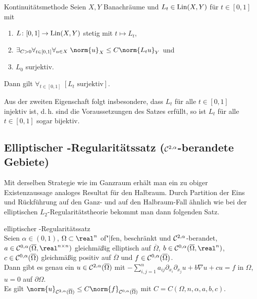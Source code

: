 \begin{Satz}{Kontinuitätsmethode}
    Seien $X, Y$ Banachräume und $L_t \in \operatorname{Lin}(X, Y)$ für $t \in [0, 1]$ mit
    \begin{enumerate}
        \item
        $L\colon [0,1] \rightarrow \operatorname{Lin}(X, Y)$ stetig mit $t \mapsto L_t$,

        \item
        $\exists_{C > 0} \forall_{t \in [0, 1]} \forall_{u \in X}\;
        \norm{u}_X \le C \norm{L_t u}_Y$ und

        \item
        $L_0$ surjektiv.
    \end{enumerate}
    Dann gilt $\forall_{t \in [0, 1]}\; [\text{$L_t$ surjektiv}]$.
\end{Satz}

\begin{Bem}
    Aus der zweiten Eigenschaft folgt insbesondere, dass $L_t$ für alle $t \in [0, 1]$ injektiv
    ist, d.\,h. sind die Voraussetzungen des Satzes erfüllt, so ist
    $L_t$ für alle $t \in [0, 1]$ sogar bijektiv.
\end{Bem}

\subsection{%
    Elliptischer -Regularitätssatz
    (\texorpdfstring{$\mathcal{C}^{2,\alpha}$}{C² ᵅ}-berandete Gebiete)%
}

\begin{Bem}
    Mit derselben Strategie wie im Ganzraum erhält man ein zu obiger Existenzaussage
    analoges Resultat für den Halbraum.
    Durch Partition der Eins und Rückführung auf den Ganz- und auf den Halbraum-Fall ähnlich wie
    bei der elliptischen $L_2$-Regularitätstheorie bekommt man dann folgenden Satz.
\end{Bem}

\begin{Satz}{elliptischer -Regularitätssatz}\\
    Seien $\alpha \in (0, 1)$,
    $\Omega \subset \real^n$ of"|fen, beschränkt und $\mathcal{C}^{2,\alpha}$-berandet,
    $a \in \C^{0,\alpha}(\overline{\Omega}, \real^{n \times n})$
    gleichmäßig elliptisch auf $\overline{\Omega}$,
    $b \in \C^{0,\alpha}(\overline{\Omega}, \real^n)$,
    $c \in \mathcal{C}^{0,\alpha}(\overline{\Omega})$ gleichmäßig positiv auf $\overline{\Omega}$ und
    $f \in \mathcal{C}^{0,\alpha}(\overline{\Omega})$.\\
    Dann gibt es genau ein $u \in \mathcal{C}^{2,\alpha}(\overline{\Omega})$ mit
    $-\sum_{i,j=1}^n a_{ij} \partial_{x_i} \partial_{x_j} u + b \nabla u + cu = f$ in $\Omega$,
    $u = 0$ auf $\partial\Omega$.\\
    Es gilt
    $\norm{u}_{\C^{2,\alpha}(\overline{\Omega})} \le C \norm{f}_{\C^{0,\alpha}(\overline{\Omega})}$
    mit $C = C(\Omega, n, \alpha, a, b, c)$.
\end{Satz}

